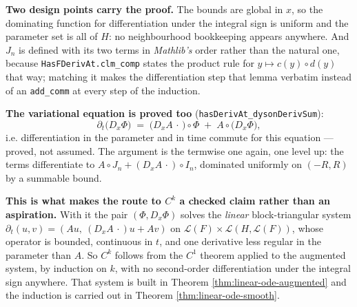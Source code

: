 \begin{theorem}
  \textbf{Two design points carry the proof.} The bounds are global in $x$, so the dominating
  function for differentiation under the integral sign is uniform and the parameter set is all
  of $H$: no neighbourhood bookkeeping appears anywhere. And $J_n$ is defined with its two
  terms in \emph{Mathlib's} order rather than the natural one, because
  \texttt{HasFDerivAt.clm\_comp} states the product rule for $y \mapsto c(y)\circ d(y)$ that
  way; matching it makes the differentiation step that lemma verbatim instead of an
  \texttt{add\_comm} at every step of the induction.

  \textbf{The variational equation is proved too} (\texttt{hasDerivAt\_dysonDerivSum}):
  \[
    \partial_t\big(D_x\Phi\big) \;=\; \big(D_xA\,\cdot\,\big)\circ\Phi \;+\; A\circ\big(D_x\Phi\big),
  \]
  i.e. differentiation in the parameter and in time commute for this equation --- proved,
  not assumed. The argument is the termwise one again, one level up: the terms differentiate
  to $A\circ J_n + (D_xA\,\cdot)\circ I_n$, dominated uniformly on $(-R,R)$ by a summable
  bound.

  \textbf{This is what makes the route to $C^k$ a checked claim rather than an aspiration.}
  With it the pair $(\Phi, D_x\Phi)$ solves the \emph{linear} block-triangular system
  $\partial_t(u,v) = (Au,\ (D_xA\,\cdot)u + Av)$ on
  $\mathcal{L}(F) \times \mathcal{L}(H,\mathcal{L}(F))$, whose operator is bounded, continuous
  in $t$, and one derivative less regular in the parameter than $A$. So $C^k$ follows from the
  $C^1$ theorem applied to the augmented system, by induction on $k$, with no second-order
  differentiation under the integral sign anywhere. That system is built in Theorem
  \ref{thm:linear-ode-augmented} and the induction is carried out in Theorem
  \ref{thm:linear-ode-smooth}.
\end{theorem}

